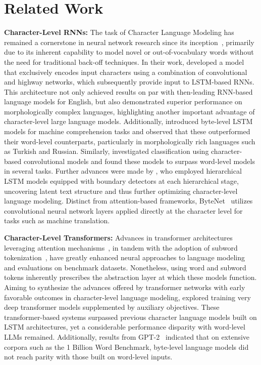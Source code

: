 \section{Related Work}
\label{section:related_work}

\textbf{Character-Level RNNs:} The task of Character Language Modeling has remained a cornerstone in neural network research since its inception~\citep{sutskever2011generating,mikolov2012subword,graves2013generating}, primarily due to its inherent capability to model novel or out-of-vocabulary words without the need for traditional back-off techniques. In their work, \cite{kim2016character} developed a model that exclusively encodes input characters using a combination of convolutional and highway networks, which subsequently provide input to LSTM-based RNNs. This architecture not only achieved results on par with then-leading RNN-based language models for English, but also demonstrated superior performance on morphologically complex languages, highlighting another important advantage of character-level large language models. Additionally, \cite{kenter2018byte} introduced byte-level LSTM models for machine comprehension tasks and observed that these outperformed their word-level counterparts, particularly in morphologically rich languages such as Turkish and Russian. Similarly, \cite{zhang2015character} investigated classification using character-based convolutional models and found these models to surpass word-level models in several tasks. Further advances were made by \citet{chung2019hierarchical}, who employed hierarchical LSTM models equipped with boundary detectors at each hierarchical stage, uncovering latent text structure and thus further optimizing character-level language modeling. Distinct from attention-based frameworks, ByteNet~\cite{kalchbrenner2016neural} utilizes convolutional neural network layers applied directly at the character level for tasks such as machine translation.

\textbf{Character-Level Transformers:} Advances in transformer architectures leveraging attention mechanisms~\citep{vaswani2017attention}, in tandem with the adoption of subword tokenization~\citep{sennrich-etal-2016-neural}, have greatly enhanced neural approaches to language modeling and evaluations on benchmark datasets. Nonetheless, using word and subword tokens inherently prescribes the abstraction layer at which these models function. Aiming to synthesize the advances offered by transformer networks with early favorable outcomes in character-level language modeling, \citet{al2019character} explored training very deep transformer models supplemented by auxiliary objectives. These transformer-based systems surpassed previous character language models built on LSTM architectures, yet a considerable performance disparity with word-level LLMs remained. Additionally, results from GPT-2~\citep{radfordgpt2} indicated that on extensive corpora such as the 1 Billion Word Benchmark, byte-level language models did not reach parity with those built on word-level inputs.

